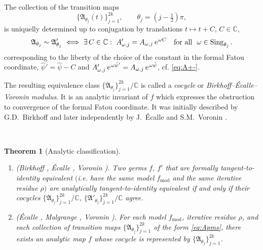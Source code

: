 \documentclass[a4paper,11pt]{amsart}
\numberwithin{equation}{section}
\newcommand{\C}{{\mathbb C}}
\newcommand{\e}{\ensuremath{\mkern.25\thinmuskip\mathrm{e}\mkern.4\thinmuskip}}
\newcommand{\model}{{\mathrm{mod}}}
\newcommand{\fmod}{f_\model}
\newcommand{\Aa}{\mathfrak{A}}
\newcommand{\Sing}{\operatorname{Sing}}
\newtheorem{theorem}{Theorem}
\theoremstyle{definition}
\begin{document}
The collection of the transition maps 
\[\big\{\Aa_{\theta_j}(t)\big\}_{j=1}^{2k},\qquad \theta_j=(j\!-\!\tfrac12)\pi,\] 
is uniquelly determined up to conjugation by translations $t\mapsto t+C$, $C\in\C$, 
\begin{equation}\label{eq:cocycleequivalence}
	\Aa_{\theta_j}\sim {\Aa}'_{\theta_j}\ \Longleftrightarrow\ \exists\, C\in\C: \ {A}'_{\omega,j}=A_{\omega,j}\, \e^{\omega C}\quad\text{for all }\ \omega\in\Sing_{\theta_j}.
\end{equation} 
corresponding to the liberty of the choice of the constant in the formal Fatou coordinate, $\hat\psi'=\hat\psi-C$ and  ${A}'_{\omega,j}\, \e^{\omega \hat\psi'}=A_{\omega,j}\, \e^{\omega \hat\psi}$, cf. \eqref{eq:A+-}.

The resulting equivalence class 
$\big\{ \Aa_{\theta_j}\big\}_{j=1}^{2k}\big/\C$
is called a \emph{cocycle} or \emph{Birkhoff--\'Ecalle--Voronin modulus}.
It is an analytic invariant of $f$  which expresses the obstruction to convergence of the formal Fatou coordinate. 
It was initially described by G.D.~Birkhoff \cite{Birkhoff} and later independently by J.~\'Ecalle \cite{Ecalle1,Ecalle} and S.M.~Voronin \cite{Voronin}.

~
\goodbreak

\begin{theorem}[Analytic classification]\label{thm:Ecalle1}~
	\begin{enumerate}[wide=0pt, leftmargin=\parindent]
		\item \textnormal{(Birkhoff \cite{Birkhoff}, \'Ecalle \cite{Ecalle1, Ecalle}, Voronin \cite{Voronin}).}
		Two germs $f$, $f'$ that are formally tangent-to-identity equivalent $($i.e. have the same model $\fmod$ and the same iterative residue $\rho)$ are analytically tangent-to-identity equivalent if and only if their cocycles $\big\{ \Aa_{\theta_j}\big\}_{j=1}^{2k}\big/\C$, $\big\{{\Aa}'_{\theta_j}\big\}_{j=1}^{2k}\big/\C$ agree.
		\smallskip
		
		\item \textnormal{(\'Ecalle \cite{Ecalle2}, Malgrange \cite{Malg-diffeo}, Voronin \cite{Voronin}).}
		For each model $\fmod$, iterative residue $\rho$, and each collection of transition maps $\big\{\Aa_{\theta_j}\big\}_{j=1}^{2k}$ of the form \eqref{eq:Apms}, there exists an analytic map $f$ whose cocycle is represented by $\big\{\Aa_{\theta_j}\big\}_{j=1}^{2k}$.
	\end{enumerate}	
\end{theorem}
\end{document}
